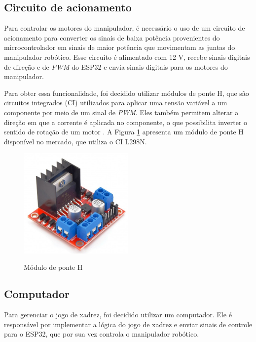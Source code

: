 \subsection[Circuito de acionamento]{Circuito de acionamento}
\label{sub:circuitoAcionamento}

Para controlar os motores do manipulador, é necessário o uso de um circuito de acionamento para converter os sinais de baixa potência provenientes do microcontrolador em sinais de maior potência que movimentam as juntas do manipulador robótico.
Esse circuito é alimentado com 12 V, recebe sinais digitais de direção e de \textit{PWM} do ESP32 e envia sinais digitais para os motores do manipulador.

Para obter essa funcionalidade, foi decidido utilizar módulos de ponte H, que são circuitos integrados (CI) utilizados para aplicar uma tensão variável a um componente por meio de um sinal de \textit{PWM}.
Eles também permitem alterar a direção em que a corrente é aplicada no componente, o que possibilita inverter o sentido de rotação de um motor \cite{h_bridge}.
A Figura \ref{fig:ponteH} apresenta um módulo de ponte H disponível no mercado, que utiliza o CI L298N.

\begin{figure}[H]
    \centering
    \caption{Módulo de ponte H}
    \includegraphics[keepaspectratio=true, width=0.5\textwidth]
    	{img/ponte-h.jpg}
    \label{fig:ponteH}
\end{figure}

\subsection[Computador]{Computador}
\label{sub:computador}

Para gerenciar o jogo de xadrez, foi decidido utilizar um computador.
Ele é responsável por implementar a lógica do jogo de xadrez e enviar sinais de controle para o ESP32, que por sua vez controla o manipulador robótico.

